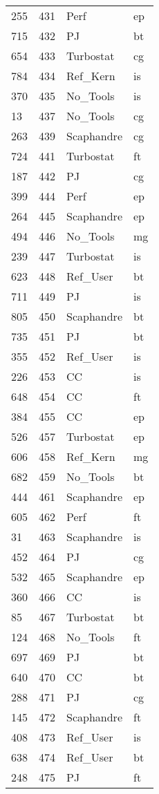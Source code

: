 \begin{tabular}{lrll}
255 & 431 & Perf & ep \\
715 & 432 & PJ & bt \\
654 & 433 & Turbostat & cg \\
784 & 434 & Ref_Kern & is \\
370 & 435 & No_Tools & is \\
13 & 437 & No_Tools & cg \\
263 & 439 & Scaphandre & cg \\
724 & 441 & Turbostat & ft \\
187 & 442 & PJ & cg \\
399 & 444 & Perf & ep \\
264 & 445 & Scaphandre & ep \\
494 & 446 & No_Tools & mg \\
239 & 447 & Turbostat & is \\
623 & 448 & Ref_User & bt \\
711 & 449 & PJ & is \\
805 & 450 & Scaphandre & bt \\
735 & 451 & PJ & bt \\
355 & 452 & Ref_User & is \\
226 & 453 & CC & is \\
648 & 454 & CC & ft \\
384 & 455 & CC & ep \\
526 & 457 & Turbostat & ep \\
606 & 458 & Ref_Kern & mg \\
682 & 459 & No_Tools & bt \\
444 & 461 & Scaphandre & ep \\
605 & 462 & Perf & ft \\
31 & 463 & Scaphandre & is \\
452 & 464 & PJ & cg \\
532 & 465 & Scaphandre & ep \\
360 & 466 & CC & is \\
85 & 467 & Turbostat & bt \\
124 & 468 & No_Tools & ft \\
697 & 469 & PJ & bt \\
640 & 470 & CC & bt \\
288 & 471 & PJ & cg \\
145 & 472 & Scaphandre & ft \\
408 & 473 & Ref_User & is \\
638 & 474 & Ref_User & bt \\
248 & 475 & PJ & ft \\

\end{tabular}
